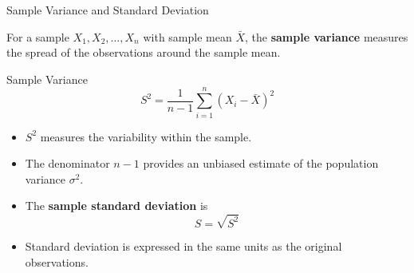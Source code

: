 \documentclass{beamer}
\begin{document}

\begin{frame}{Sample Variance and Standard Deviation}

For a sample $X_1,X_2,\ldots,X_n$ with sample mean $\bar{X}$,
the \textbf{sample variance} measures the spread of the observations
around the sample mean.

\begin{block}{Sample Variance}
\[
\boxed{
S^2
=
\frac{1}{n-1}
\sum_{i=1}^{n}(X_i-\bar{X})^2
}
\]
\end{block}

\begin{itemize}
    \item $S^2$ measures the variability within the sample.
    \item The denominator $n-1$ provides an unbiased estimate of
          the population variance $\sigma^2$.
    \item The \textbf{sample standard deviation} is
    \[
    \boxed{S=\sqrt{S^2}}
    \]
    \item Standard deviation is expressed in the same units as the
          original observations.
\end{itemize}

\end{frame}

\end{document}
